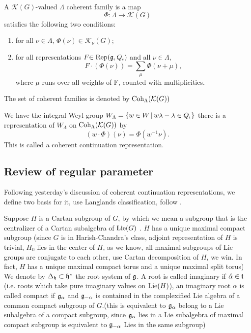 \begin{defn}
  A $\mathcal{K}(G)$-valued $\Lambda$ coherent family is a map
  \[\varPhi : \Lambda \to \mathcal{K}(G)\]
  satisfies the following two conditions:
  \begin{enumerate}
    \item for all $\nu \in \Lambda$, $\varPhi(\nu) \in \mathcal{K}_{\nu}(G)$;
    \item for all representations $F \mathrm{ \in Rep}(\mathfrak{g},Q_\iota)$ and all $\nu \in \Lambda$,
          \[F \cdot (\varPhi(\nu)) = \sum\limits_{\mu} \varPhi(\nu + \mu),\]
          where $\mu$ runs over all weights of $\mathrm{F}$, counted with multiplicities.
  \end{enumerate}
  The set of coherent families is denoted by $\operatorname{Coh}_\Lambda(\mathcal{K}(G))$
\end{defn}
We have the integral Weyl group $W_{\Lambda} = \{w \in W\,|\,w\lambda - \lambda \in Q_\iota\}$
there is a representation of $W_\Lambda$ on $\operatorname{Coh}_\Lambda(\mathcal{K}(G))$ by
\[(w \cdot \varPhi)(\nu) = \varPhi (w^{-1}\nu).\]
This is called a coherent continuation representation.




\label{2}

\subsection{Review of regular parameter}

Following yesterday's discussion of coherent continuation representations, we define two basis
for it, use Langlands classification, follow \cite{BMSZ22}.

Suppose $H$ is a Cartan subgroup of $G$, by which we mean a subgroup that is the centralizer of
a Cartan subalgebra of $\operatorname{Lie}(G)$ . $H$ has a unique maximal compact subgroup (since $G$ is in Harish-Chandra's
class, adjoint representation of $H$ is trivial, $H_0$ lies in the center of $H$, as we know, all
maximal subgroups of Lie groups are conjugate to each other, use Cartan decomposition of $H$, we win. In fact,
$H$ has a unique maximal compact torus and a unique maximal split torus)
We denote by $\Delta_{\mathfrak{h}} \subset \mathfrak{h}^*$ the root system of $\mathfrak{g}$. A root is called imaginary
if $\check{\alpha } \in \mathfrak{t}$ (i.e. roots which take pure imaginary values on $\operatorname{Lie}(H)$), an imaginary root $\alpha$ is
called compact if $\mathfrak{g}_{\alpha}$ and $\mathfrak{g}_{-\alpha}$ is contained in the complexified Lie algebra of a common compact subgroup of $G$.(this is equivalent to $\mathfrak{g}_\alpha $ belong to a Lie subalgebra of a compact subgroup, since $\mathfrak{g}_\alpha $ lies in a Lie subalgebra of maximal compact subgroup is equivalent to $\mathfrak{g}_{-\alpha }$ Lies in the same subgroup)



